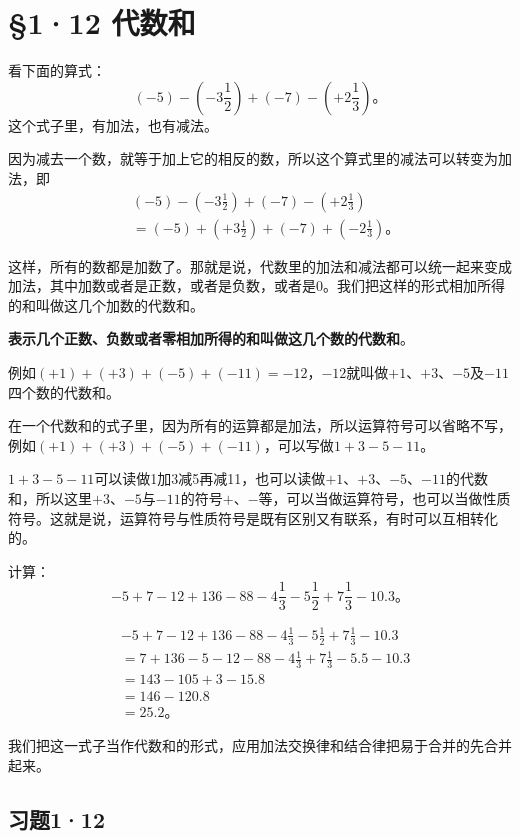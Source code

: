 \section{§1·12 代数和}

看下面的算式：
\[
(-5) - \left(-3\frac{1}{2}\right) + (-7) - \left(+2\frac{1}{3}\right)。
\]
这个式子里，有加法，也有减法。

因为减去一个数，就等于加上它的相反的数，所以这个算式里的减法可以转变为加法，即
\begin{align*}
&(-5) - \left(-3\frac{1}{2}\right) + (-7) - \left(+2\frac{1}{3}\right) \\
&= (-5) + \left(+3\frac{1}{2}\right) + (-7) + \left(-2\frac{1}{3}\right)。
\end{align*}

这样，所有的数都是加数了。那就是说，代数里的加法和减法都可以统一起来变成加法，其中加数或者是正数，或者是负数，或者是0。我们把这样的形式相加所得的和叫做这几个加数的代数和。

\textbf{表示几个正数、负数或者零相加所得的和叫做这几个数的代数和}。

例如\((+1) + (+3) + (-5) + (-11) = -12\)，$-12$就叫做$+1$、$+$3、$-5$及$-11$四个数的代数和。

在一个代数和的式子里，因为所有的运算都是加法，所以运算符号可以省略不写，例如\((+1) + (+3) + (-5) + (-11)\)，可以写做\(1 + 3 - 5 - 11\)。

 $1 + 3 - 5 - 11$可以读做1加3减5再减11，也可以读做$+1$、$+$3、$-5$、$-11$的代数和，所以这里$+3$、$-5$与$-11$的符号$+$、$-$等，可以当做运算符号，也可以当做性质符号。这就是说，运算符号与性质符号是既有区别又有联系，有时可以互相转化的。

 计算：
\[
-5 + 7 - 12 + 136 - 88 - 4\frac{1}{3} - 5\frac{1}{2} + 7\frac{1}{3} - 10.3。
\]

\begin{align*}
&-5 + 7 - 12 + 136 - 88 - 4\frac{1}{3} - 5\frac{1}{2} + 7\frac{1}{3} - 10.3 \\
&= 7 + 136 - 5 - 12 - 88 - 4\frac{1}{3} + 7\frac{1}{3} - 5.5 - 10.3 \\
&= 143 - 105 + 3 - 15.8 \\
&= 146 - 120.8 \\
&= 25.2。
\end{align*}

 我们把这一式子当作代数和的形式，应用加法交换律和结合律把易于合并的先合并起来。

\subsection{习题1·12}

